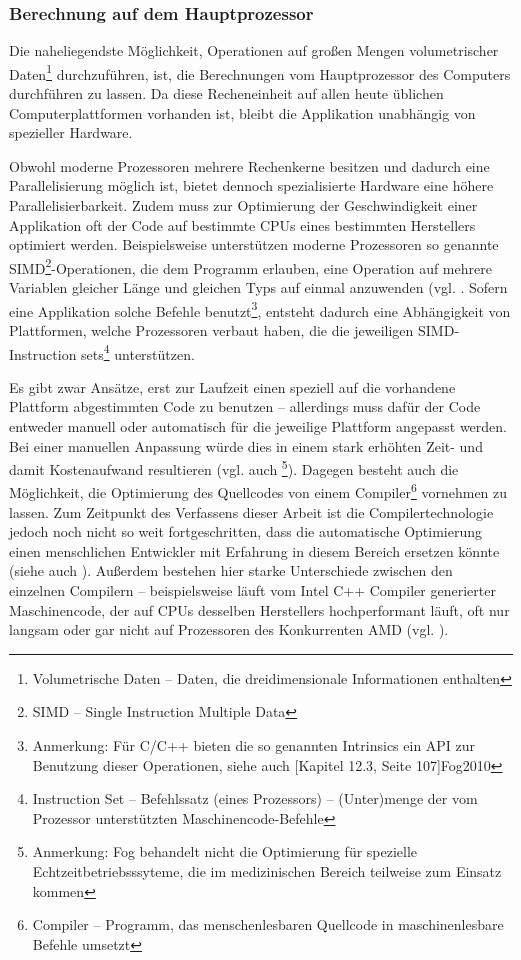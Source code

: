 \documentclass[ngerman,pdftex,paper=A4,DIV=calc,titlepage,12pt]{scrartcl}
\newtheorem[L]{boxedDefinition}{Definition}
\begin{document}
\subsubsection{Berechnung auf dem Hauptprozessor}\label{sssec:cpucalculation}
Die naheliegendste Möglichkeit, Operationen auf großen Mengen volumetrischer Daten\footnote{Volumetrische Daten -- Daten, die dreidimensionale Informationen enthalten} durchzuführen, ist, die Berechnungen vom Hauptprozessor des Computers durchführen zu lassen. Da diese Recheneinheit auf allen heute üblichen Computerplattformen vorhanden ist, bleibt die Applikation unabhängig von spezieller Hardware.

Obwohl moderne Prozessoren mehrere Rechenkerne besitzen und dadurch eine Parallelisierung möglich ist, bietet dennoch spezialisierte Hardware eine höhere Parallelisierbarkeit. Zudem muss zur Optimierung der Geschwindigkeit einer Applikation oft der Code auf bestimmte CPUs eines bestimmten Herstellers optimiert werden. Beispielsweise unterstützen moderne Prozessoren so genannte SIMD\footnote{SIMD -- Single Instruction Multiple Data}-Operationen, die dem Programm erlauben, eine Operation auf mehrere Variablen gleicher Länge und gleichen Typs auf einmal anzuwenden (vgl. \cite[Kapitel 12, Seite 103]{Fog2010}. Sofern eine Applikation solche Befehle benutzt\footnote{Anmerkung: Für C/C++ bieten die so genannten Intrinsics ein API zur Benutzung dieser Operationen, siehe auch [Kapitel 12.3, Seite 107]{Fog2010}}, entsteht dadurch eine Abhängigkeit von Plattformen, welche Prozessoren verbaut haben, die die jeweiligen SIMD-Instruction sets\footnote{Instruction Set -- Befehlssatz (eines Prozessors) -- (Unter)menge der vom Prozessor unterstützten Maschinencode-Befehle} unterstützen.

Es gibt zwar Ansätze, erst zur Laufzeit einen speziell auf die vorhandene Plattform abgestimmten Code zu benutzen -- allerdings muss dafür der Code entweder manuell oder automatisch für die jeweilige Plattform angepasst werden. Bei einer manuellen Anpassung würde dies in einem stark erhöhten Zeit- und damit Kostenaufwand resultieren (vgl. auch \cite{Fog2010}\footnote{Anmerkung: Fog behandelt nicht die Optimierung für spezielle Echtzeitbetriebsssyteme, die im medizinischen Bereich teilweise zum Einsatz kommen}). Dagegen besteht auch die Möglichkeit, die Optimierung des Quellcodes von einem Compiler\footnote{Compiler -- Programm, das menschenlesbaren Quellcode in maschinenlesbare Befehle umsetzt} vornehmen zu lassen. Zum Zeitpunkt des Verfassens dieser Arbeit ist die Compilertechnologie jedoch noch nicht so weit fortgeschritten, dass die automatische Optimierung einen menschlichen Entwickler mit Erfahrung in diesem Bereich ersetzen könnte (siehe auch \cite{Fog2010}). Außerdem bestehen hier starke Unterschiede zwischen den einzelnen Compilern -- beispielsweise läuft vom Intel C++ Compiler generierter Maschinencode, der auf CPUs desselben Herstellers hochperformant läuft, oft nur langsam oder gar nicht auf Prozessoren des Konkurrenten AMD (vgl. \cite[Kapitel 2.5, Seite 10]{Fog2010}).
\end{document}
